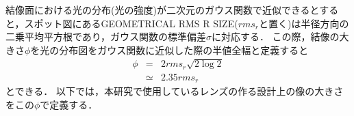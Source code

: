 結像面における光の分布(光の強度)が二次元のガウス関数で近似できるとすると，スポット図にあるGEOMETRICAL RMS R SIZE($rms_r$と置く)は半径方向の二乗平均平方根であり，ガウス関数の標準偏差$\sigma$に対応する．
この際，結像の大きさ$\phi$を光の分布図をガウス関数に近似した際の半値全幅と定義すると
\begin{eqnarray}
     \phi &=& 2rms_r \sqrt{2\log2} \nonumber \\
     &\simeq&2.35rms_r
\end{eqnarray}
とできる．
以下では，本研究で使用しているレンズの作る設計上の像の大きさをこの$\phi$で定義する．